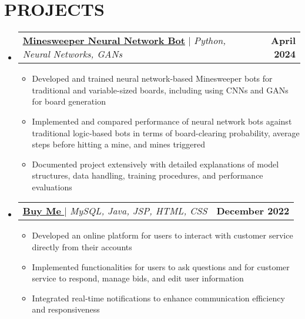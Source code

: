 \documentclass[letterpaper,11pt]{article}
\makeatletter
\newcommand{\resumeItem}[1]{
  \item\small{
    {#1 \vspace{-2pt}}
  }
}
\newcommand{\resumeProjectHeading}[2]{
    \item
    \begin{tabular*}{1.001\textwidth}{l@{\extracolsep{\fill}}r}
      \small#1 & \textbf{\small #2}\\
    \end{tabular*}\vspace{-7pt}
}
\newcommand{\resumeSubHeadingListStart}{\begin{itemize}[leftmargin=0.0in, label={}]}
\newcommand{\resumeSubHeadingListEnd}{\end{itemize}}
\newcommand{\resumeItemListStart}{\begin{itemize}}
\newcommand{\resumeItemListEnd}{\end{itemize}\vspace{-5pt}}
\makeatother
\begin{document}
\section{PROJECTS}
    \vspace{-5pt}
    \resumeSubHeadingListStart
          \resumeProjectHeading
          {\href{https://github.com/Romilpatel87/Minesweeper}{\textbf{\large{\underline{Minesweeper Neural Network Bot}}}} $|$ \large{\textit{Python, Neural Networks, GANs}}}{April 2024}
          \resumeItemListStart
            \resumeItem{\normalsize{Developed and trained neural network-based Minesweeper bots for traditional and variable-sized boards, including using CNNs and GANs for board generation}}
            \resumeItem{\normalsize{Implemented and compared performance of neural network bots against traditional logic-based bots in terms of board-clearing probability, average steps before hitting a mine, and mines triggered}}
            \resumeItem{\normalsize{Documented project extensively with detailed explanations of model structures, data handling, training procedures, and performance evaluations}}
          \resumeItemListEnd
          \vspace{-10pt}
          
          \resumeProjectHeading
          {\href{https://github.com/Romilpatel87/BuyMe_AuctionServices}{\textbf{\large{\underline{Buy Me}}} } $|$ \large{\textit{MySQL, Java, JSP, HTML, CSS}}}{December 2022}
          \resumeItemListStart
            \resumeItem{\normalsize{Developed an online platform for users to interact with customer service directly from their accounts}}
            \resumeItem{\normalsize{Implemented functionalities for users to ask questions and for customer service to respond, manage bids, and edit user information}}
            \resumeItem{\normalsize{Integrated real-time notifications to enhance communication efficiency and responsiveness}}
          \resumeItemListEnd
    \resumeSubHeadingListEnd
\vspace{-10pt}
\end{document}
